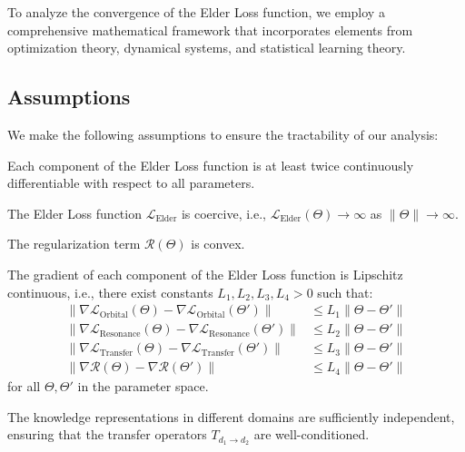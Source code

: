 To analyze the convergence of the Elder Loss function, we employ a comprehensive mathematical framework that incorporates elements from optimization theory, dynamical systems, and statistical learning theory.

\subsection{Assumptions}

We make the following assumptions to ensure the tractability of our analysis:

\begin{assumption}[Smoothness]
Each component of the Elder Loss function is at least twice continuously differentiable with respect to all parameters.
\end{assumption}

\begin{assumption}[Coercivity]
The Elder Loss function $\mathcal{L}_{\text{Elder}}$ is coercive, i.e., $\mathcal{L}_{\text{Elder}}(\Theta) \to \infty$ as $\|\Theta\| \to \infty$.
\end{assumption}

\begin{assumption}
The regularization term $\mathcal{R}(\Theta)$ is convex.
\end{assumption}

\begin{assumption}
The gradient of each component of the Elder Loss function is Lipschitz continuous, i.e., there exist constants $L_1, L_2, L_3, L_4 > 0$ such that:
\begin{align}
\|\nabla \mathcal{L}_{\text{Orbital}}(\Theta) - \nabla \mathcal{L}_{\text{Orbital}}(\Theta')\| &\leq L_1 \|\Theta - \Theta'\| \\
\|\nabla \mathcal{L}_{\text{Resonance}}(\Theta) - \nabla \mathcal{L}_{\text{Resonance}}(\Theta')\| &\leq L_2 \|\Theta - \Theta'\| \\
\|\nabla \mathcal{L}_{\text{Transfer}}(\Theta) - \nabla \mathcal{L}_{\text{Transfer}}(\Theta')\| &\leq L_3 \|\Theta - \Theta'\| \\
\|\nabla \mathcal{R}(\Theta) - \nabla \mathcal{R}(\Theta')\| &\leq L_4 \|\Theta - \Theta'\|
\end{align}
for all $\Theta, \Theta'$ in the parameter space.
\end{assumption}

\begin{assumption}
The knowledge representations in different domains are sufficiently independent, ensuring that the transfer operators $T_{d_1 \rightarrow d_2}$ are well-conditioned.
\end{assumption}

